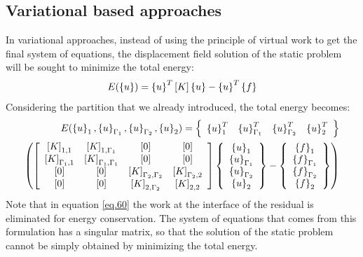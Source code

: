 \subsection{Variational based approaches}\label{ssec34}
In variational approaches, instead of using the principle of virtual work to get the final system of equations, the displacement field solution of the static problem will be sought to minimize the total energy:
\begin{equation}
\label{eq.59}
E(\left\lbrace{u}\right \rbrace)=\left\lbrace{u}\right \rbrace^T\left[{K}\right]\left\lbrace{u}\right \rbrace-\left\lbrace{u}\right \rbrace^T\left\lbrace{f}\right \rbrace
\end{equation}
Considering the partition that we already introduced, the total energy becomes:
\begin{equation}
\label{eq.60}
\begin{aligned}
E( \left\lbrace{u}\right \rbrace_1,\left\lbrace{u}\right \rbrace_{\Gamma_1},\left\lbrace{u}\right \rbrace_{\Gamma_2},\left\lbrace{u}\right \rbrace_2
    )=\left\lbrace\begin{array}{cccc} \left\lbrace{u}\right \rbrace_1^T&\left\lbrace{u}\right \rbrace_{\Gamma_1}^T&\left\lbrace{u}\right \rbrace_{\Gamma_2}^T&\left\lbrace{u}\right \rbrace_2^T
    \end{array}\right\rbrace \\\left(\left[ \begin{array}{cccc} 
    \left[{K}\right]_{1,1} & \left[{K}\right]_{1,\Gamma_1} & \left[{0}\right]& \left[{0}\right] \\
   \left[{K}\right]_{\Gamma_1,1} & \left[{K}\right]_{\Gamma_1,\Gamma_1} & \left[{0}\right]& \left[{0}\right]\\ \left[{0}\right]& \left[{0}\right]& \left[{K}\right]_{\Gamma_2,\Gamma_2}&\left[{K}\right]_{\Gamma_2,2}\\   
    \left[{0}\right] & \left[{0}\right]& \left[{K}\right]_{2,\Gamma_2} & \left[{K}\right]_{2,2}\end{array} \right]\left\lbrace\begin{array}{c} \left\lbrace{u}\right \rbrace_1\\\left\lbrace{u}\right \rbrace_{\Gamma_1}\\\left\lbrace{u}\right \rbrace_{\Gamma_2}\\\left\lbrace{u}\right \rbrace_2
    \end{array}\right\rbrace
    -\left\lbrace\begin{array}{c} \left\lbrace{f}\right \rbrace_1\\\left\lbrace{f}\right \rbrace_{\Gamma_1}\\\left\lbrace{f}\right \rbrace_{\Gamma_2}\\\left\lbrace{f}\right \rbrace_2
    \end{array}\right\rbrace\right)
\end{aligned}
\end{equation}
Note that in equation \eqref{eq.60} the work at the interface of the residual is eliminated for energy conservation. The system of equations that comes from this formulation has a singular matrix, so that the solution of the static problem cannot be simply obtained by minimizing the total energy.
